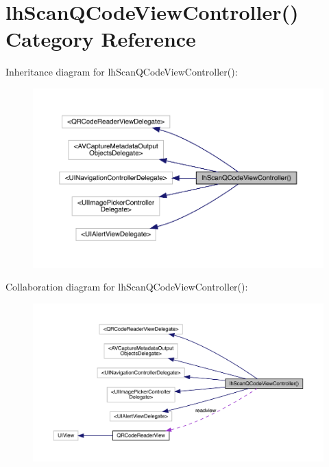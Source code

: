 \hypertarget{categorylh_scan_q_code_view_controller_07_08}{}\section{lh\+Scan\+Q\+Code\+View\+Controller() Category Reference}
\label{categorylh_scan_q_code_view_controller_07_08}


Inheritance diagram for lh\+Scan\+Q\+Code\+View\+Controller()\+:\nopagebreak
\begin{figure}[H]
\begin{center}
\leavevmode
\includegraphics[width=350pt]{categorylh_scan_q_code_view_controller_07_08__inherit__graph}
\end{center}
\end{figure}


Collaboration diagram for lh\+Scan\+Q\+Code\+View\+Controller()\+:\nopagebreak
\begin{figure}[H]
\begin{center}
\leavevmode
\includegraphics[width=350pt]{categorylh_scan_q_code_view_controller_07_08__coll__graph}
\end{center}
\end{figure}
